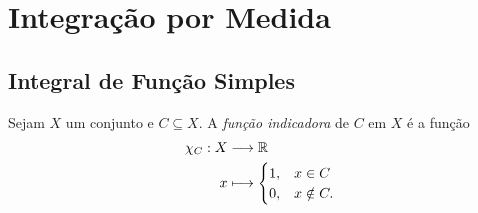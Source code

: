 \chapter{Integração por Medida}

\section{Integral de Função Simples}

\begin{defi}
Sejam $X$ um conjunto e $C \subseteq X$. A \emph{função indicadora} de $C$ em $X$ é a função
	\begin{align*}
	{\chi_C}: {X} &\longrightarrow {\mathbb{R}} \\{x} &\longmapsto {
	\begin{cases}
		1,& x \in C \\
		0,& x \notin C.
	\end{cases}
	}
	\end{align*}
\end{defi}

